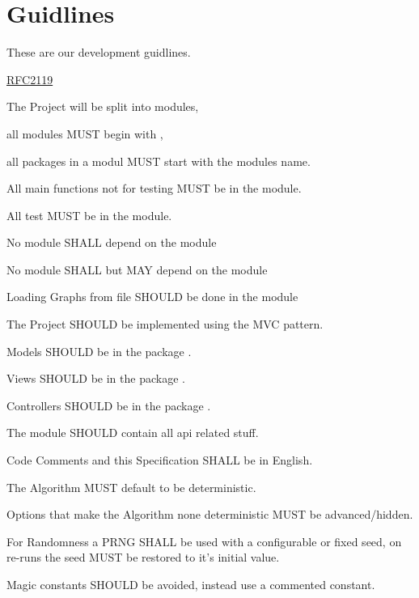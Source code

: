 \section{Guidlines}

These are our development guidlines.

\href{https://www.ietf.org/rfc/rfc2119.txt}{RFC2119}

\begin{list}{-}{}
\item The Project will be split into modules,

all modules MUST begin with \basemodule,

all packages in a modul MUST start with the modules name.

\item All main functions not for testing MUST be in the \basemodule[.main] module.

\item All test MUST be in the \basemodule[.test] module.

\item No module SHALL depend on the module \basemodule[.test]

\item No module SHALL but  \basemodule[.test] MAY depend on the module \basemodule[.main]

\item Loading Graphs from file SHOULD be done in the \basemodule[.file] module

\item The Project SHOULD be implemented using the MVC pattern.

\item Models SHOULD be in the package \basemodule[.modle].

\item Views SHOULD be in the package \basemodule[.view].

\item Controllers SHOULD be in the package \basemodule[.control].

\item The module \basemodule[.api] SHOULD contain all api related stuff. %

\item Code Comments and this Specification SHALL be in English.

\item The Algorithm MUST default to be deterministic.

\item Options that make the Algorithm none deterministic MUST be advanced/hidden.

\item For Randomness a PRNG SHALL be used with a configurable or fixed seed,
on re-runs the seed MUST be restored to it's initial value.

\item Magic constants SHOULD be avoided, instead use a commented constant.
\end{list}
